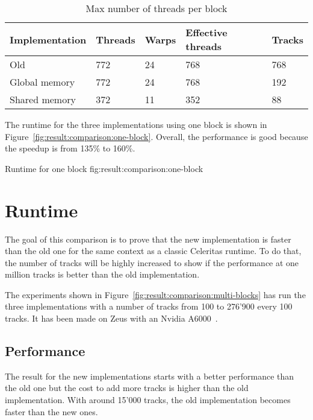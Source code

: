 \begin{table}[ht]
    \centering
    \begin{tabular}{|l|l|l|l|l|}
        \hline
        \textbf{Implementation} & \textbf{Threads} & \textbf{Warps} & \textbf{Effective threads} & \textbf{Tracks} \\
        \hline
        Old & 772 & 24 & 768 & 768 \\
        \hline
        Global memory & 772 & 24 & 768 & 192 \\
        \hline
        Shared memory & 372 & 11 & 352 & 88 \\
        \hline
    \end{tabular}
    \caption{Max number of threads per block}
    \label{tab:result:comparison:block}
\end{table}

The runtime for the three implementations using one block is shown in
Figure~\ref{fig:result:comparison:one-block}.
Overall, the performance is good because the speedup is from 135\% to 160\%.

{Runtime for one block}
{fig:result:comparison:one-block}

\section{Runtime}
\label{ch:result:comparison:runtime}

The goal of this comparison is to prove that the new implementation is faster
than the old one for the same context as a classic Celeritas runtime.
To do that, the number of tracks will be highly increased to show if the
performance at one million tracks is better than the old implementation.

The experiments shown in Figure~\ref{fig:result:comparison:multi-blocks} has run the
three implementations with a number of tracks from 100 to 276'900 every 100
tracks.
It has been made on Zeus with an Nvidia A6000~\cite{nvidia-a6000}.

\subsection{Performance}
\label{ch:result:comparison:performance}

The result for the new implementations starts with a better performance than the
old one but the cost to add more tracks is higher than the old implementation.
With around 15'000 tracks, the old implementation becomes faster than the new ones.

